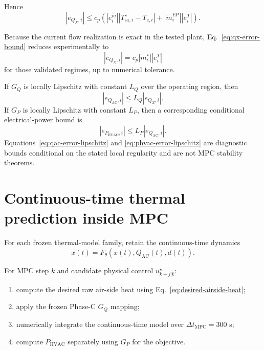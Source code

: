 \documentclass[11pt]{article}
\newcommand{\mdot}{\dot m}
\newcommand{\Qac}{Q_{\mathrm{AC}}}
\newcommand{\Phvac}{P_{\mathrm{HVAC}}}
\begin{document}
Hence
\begin{equation}
\boxed{
|e_{Q_X,i}|
\le
c_p
\left(
|e_i^{\mdot}|
|T_{\mathrm{sa},i}^\star-T_{z,i}|
+
|\mdot_i^{\mathrm{EP}}|
|e_i^T|
\right).
}
\label{eq:qx-error-bound}
\end{equation}

Because the current flow realization is exact in the tested plant,
Eq.~\eqref{eq:qx-error-bound} reduces experimentally to
\begin{equation}
|e_{Q_X,i}|
=
c_p
|\mdot_i^\star|
|e_i^T|
\end{equation}
for those validated regimes, up to numerical tolerance.

If $G_Q$ is locally Lipschitz with constant $L_Q$ over the operating region,
then
\begin{equation}
|e_{Q_{\mathrm{AC}},i}|
\le
L_Q |e_{Q_X,i}|.
\label{eq:qac-error-lipschitz}
\end{equation}
If $G_P$ is locally Lipschitz with constant $L_P$, then a corresponding
conditional electrical-power bound is
\begin{equation}
|e_{P_{\mathrm{HVAC}},i}|
\le
L_P |e_{Q_{\mathrm{AC}},i}|.
\label{eq:phvac-error-lipschitz}
\end{equation}
Equations~\eqref{eq:qac-error-lipschitz} and
\eqref{eq:phvac-error-lipschitz} are diagnostic bounds conditional on the
stated local regularity and are not MPC stability theorems.

\section{Continuous-time thermal prediction inside MPC}

For each frozen thermal-model family, retain the continuous-time dynamics
\begin{equation}
\dot x(t)
=
F_\theta
\left(
x(t),
\Qac(t),
d(t)
\right).
\label{eq:continuous-model}
\end{equation}

For MPC step $k$ and candidate physical control
$u_{k+j|k}^{\star}$:
\begin{enumerate}[leftmargin=2em]
\item compute the desired raw air-side heat using
Eq.~\eqref{eq:desired-airside-heat};
\item apply the frozen Phase-C $G_Q$ mapping;
\item numerically integrate the continuous-time model over
$\Delta t_{\mathrm{MPC}}=300$ s;
\item compute $\Phvac$ separately using $G_P$ for the objective.
\end{enumerate}
\end{document}
